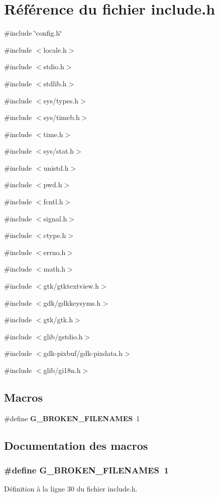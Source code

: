\section{Référence du fichier include.h}
\label{include_8h}
{\ttfamily \#include \char`\"{}config.h\char`\"{}}\par
{\ttfamily \#include $<$locale.h$>$}\par
{\ttfamily \#include $<$stdio.h$>$}\par
{\ttfamily \#include $<$stdlib.h$>$}\par
{\ttfamily \#include $<$sys/types.h$>$}\par
{\ttfamily \#include $<$sys/timeb.h$>$}\par
{\ttfamily \#include $<$time.h$>$}\par
{\ttfamily \#include $<$sys/stat.h$>$}\par
{\ttfamily \#include $<$unistd.h$>$}\par
{\ttfamily \#include $<$pwd.h$>$}\par
{\ttfamily \#include $<$fcntl.h$>$}\par
{\ttfamily \#include $<$signal.h$>$}\par
{\ttfamily \#include $<$ctype.h$>$}\par
{\ttfamily \#include $<$errno.h$>$}\par
{\ttfamily \#include $<$math.h$>$}\par
{\ttfamily \#include $<$gtk/gtktextview.h$>$}\par
{\ttfamily \#include $<$gdk/gdkkeysyms.h$>$}\par
{\ttfamily \#include $<$gtk/gtk.h$>$}\par
{\ttfamily \#include $<$glib/gstdio.h$>$}\par
{\ttfamily \#include $<$gdk-\/pixbuf/gdk-\/pixdata.h$>$}\par
{\ttfamily \#include $<$glib/gi18n.h$>$}\par
\subsection*{Macros}
\begin{DoxyCompactItemize}
\item 
\#define {\bf G\_\-BROKEN\_\-FILENAMES}~1
\end{DoxyCompactItemize}


\subsection{Documentation des macros}
\subsubsection[{G\_\-BROKEN\_\-FILENAMES}]{\setlength{\rightskip}{0pt plus 5cm}\#define G\_\-BROKEN\_\-FILENAMES~1}\label{include_8h_a2219ea7fc6c007bb5f7b509487793ab6}


Définition à la ligne 30 du fichier include.h.

